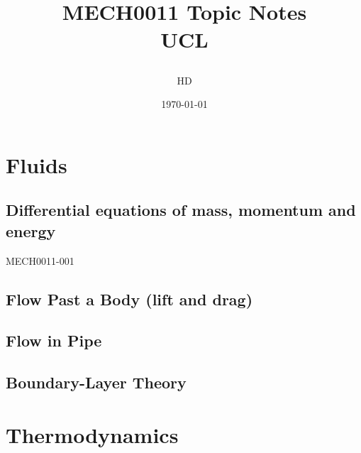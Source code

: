 \documentclass[12pt,a4paper, twoside]{report}
\begin{document}
\title{
  {MECH0011 Topic Notes}\\
  {\large UCL}
  \author{HD}
  \date{\today}
}
\maketitle
\tableofcontents
\part{Fluids}
\chapter{Differential equations of mass, momentum and energy}
{MECH0011-001}
\chapter{Flow Past a Body (lift and drag)}
\chapter{Flow in Pipe}
\chapter{Boundary-Layer Theory}
\part{Thermodynamics}
\end{document}
